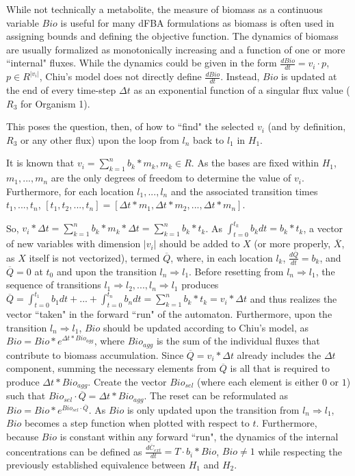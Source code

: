 While not technically a metabolite, the measure of biomass as a continuous variable $Bio$ is useful for many dFBA formulations as biomass is often used in assigning bounds and defining the objective function. The dynamics of biomass are usually formalized as monotonically increasing and a function of one or more ``internal" fluxes. While the dynamics could be given in the form $\frac{dBio}{dt} = v_i \cdot p$, $p \in R^{|v_i|}$, Chiu's model does not directly define $\frac{dBio}{dt}$. Instead, $Bio$ is updated at the end of every time-step $\Delta t$ as an exponential function of a singular flux value ($R_3$ for Organism 1).

This poses the question, then, of how to ``find" the selected $v_i$ (and by definition, $R_3$ or any other flux) upon the loop from $l_n$ back to $l_1$ in $H_1$.


It is known that $v_i = \sum^{n}_{k=1} b_{k} * m_k, m_k \in R$. As the bases are fixed within $H_1$, $m_1, ..., m_n$ are the only degrees of freedom to determine the value of $v_i$. Furthermore, for each location $l_1, ..., l_n$ and the associated transition times $t_1, ..., t_n$, $[t_1, t_2, ..., t_n] = [\Delta t * m_1, \Delta t * m_2, ..., \Delta t * m_n ]$. %

So, $v_i * \Delta t = \sum^{n}_{k=1} b_{k} * m_k * \Delta t  = \sum^{n}_{k=1} b_{k} * t_k$. As $\int^{t_k}_{t=0} b_k dt = b_{k} * t_k$, a vector of new variables with dimension $|v_i|$ should be added to $X$ (or more properly, $\overline{X}$, as $X$ itself is not vectorized), termed $\overline{Q}$, where, in each location $l_k$, $\frac{d\overline{Q}}{dt} = b_k$, and $\overline{Q} = 0$ at $t_0$ and upon the transition $l_n \Rightarrow l_1$. Before resetting from $l_n \Rightarrow l_1$, the sequence of transitions $l_1 \Rightarrow l_2, ..., l_{n} \Rightarrow l_1$ produces $\overline{Q} = \int^{t_1}_{t=0} b_1 dt + ... + \int^{t_n}_{t=0} b_n dt = \sum^n_{k=1} b_k * t_k = v_i * \Delta t$ and thus realizes the vector ``taken" in the forward ``run" of the automaton. Furthermore, upon the transition $l_n \Rightarrow l_1$, $Bio$ should be updated according to Chiu's model, as $Bio = Bio * e^{\Delta t * Bio_{agg}}$, where $Bio_{agg}$ is the sum of the individual fluxes that contribute to biomass accumulation. Since $\overline{Q} = v_i * \Delta t$ already includes the $\Delta t$ component, summing the necessary elements from $\overline{Q}$ is all that is required to produce $\Delta t * Bio_{agg}$. Create the vector $Bio_{sel}$ (where each element is either $0$ or $1$) such that $Bio_{sel} \cdot \overline{Q} = \Delta t * Bio_{agg}$. The reset can be reformulated as $Bio = Bio * e^{Bio_{sel} \cdot \overline{Q}}$. As $Bio$ is only updated upon the transition from $l_n \Rightarrow l_1$, $Bio$ becomes a step function when plotted with respect to $t$. Furthermore, because $Bio$ is constant within any forward ``run", the dynamics of the internal concentrations can be defined as $\frac{d\overline{C}_{ext}}{dt} = T \cdot b_i * Bio$, $Bio \neq 1$ while respecting the previously established equivalence between $H_1$ and $H_2$.

